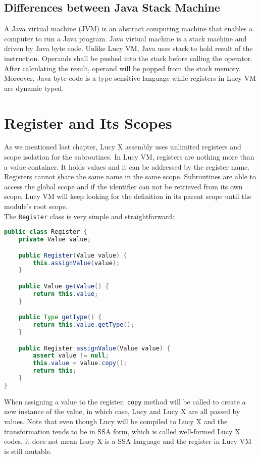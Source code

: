 \subsection{Differences between Java Stack Machine}
A Java virtual machine (JVM) is an abstract computing machine that enables a computer to run a Java program. Java virtual machine is a stack machine and driven by Java byte code. Unlike Lucy VM, Java uses stack to hold result of the instruction. Operands shall be pushed into the stack before calling the operator. After calculating the result, operand will be popped from the stack memory. Moreover, Java byte code is a type sensitive language while registers in Lucy VM are dynamic typed.


\section{Register and Its Scopes}
As we mentioned last chapter, Lucy X assembly uses unlimited registers and scope isolation for the subroutines. In Lucy VM, registers are nothing more than a value container. It holds values and it can be addressed by the register name. Registers cannot share the same name in the same scope. Subroutines are able to access the global scope and if the identifier can not be retrieved from its own scope, Lucy VM will keep looking for the definition in its parent scope until the module’s root scope. \\
The \texttt{Register} class is very simple and straightforward:
\begin{lstlisting}[language=java]
public class Register {
    private Value value;

    public Register(Value value) {
        this.assignValue(value);
    }

    public Value getValue() {
        return this.value;
    }

    public Type getType() {
        return this.value.getType();
    }

    public Register assignValue(Value value) {
        assert value != null;
        this.value = value.copy();
        return this;
    }
}
\end{lstlisting}
When assigning a value to the register, \texttt{copy} method will be called to create a new instance of the value, in which case, Lucy and Lucy X are all passed by values. Note that even though Lucy will be compiled to Lucy X and the transformation tends to be in SSA form, which is called well-formed Lucy X codes, it does not mean Lucy X is a SSA language and the register in Lucy VM is still mutable. \\
